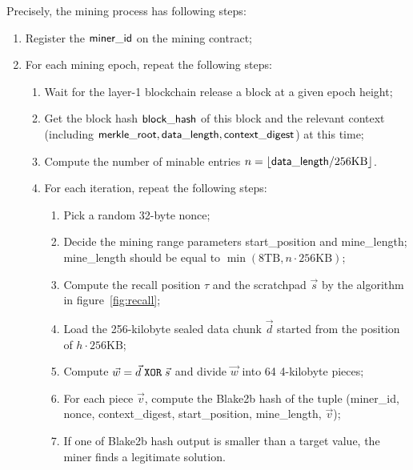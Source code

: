 Precisely, the mining process has following steps:
\begin{enumerate}
	\item Register the $\sf miner\_id$ on the mining contract;
	\item For each mining epoch, repeat the following steps:
	\begin{enumerate}
		\item Wait for the layer-1 blockchain release a block at a given epoch height;
		\item Get the block hash $\sf block\_hash$ of this block and the relevant context (including ${\sf merkle\_root, data\_length, context\_digest}$) at this time;
		\item Compute the number of minable entries $n=\lfloor {\sf data\_length} / 256\text{KB} \rfloor$.
		\item For each iteration, repeat the following steps:
		\begin{enumerate}
			\item Pick a random 32-byte {\sf nonce};
			\item Decide the mining range parameters {\sf start\_position} and {\sf mine\_length}; {\sf mine\_length} should be equal to $\min(8\text{TB},n\cdot 256\text{KB})$;
			\item Compute the recall position $\tau$ and the scratchpad $\vec{s}$ by the algorithm in figure~\ref{fig:recall};
			\item Load the 256-kilobyte sealed data chunk $\vec{d}$ started from the position of $h\cdot 256\text{KB}$;
			\item Compute $\vec{w}=\vec{d}{\;\tt XOR\; }\vec{s}$ and divide $\vec{w}$ into 64 4-kilobyte pieces;
			\item For each piece $\vec{v}$, compute the Blake2b hash of the tuple ({\sf miner\_id}, {\sf nonce}, {\sf context\_digest}, {\sf start\_position}, {\sf mine\_length}, $\vec{v}$); 
			\item If one of Blake2b hash output is smaller than a target value, the miner finds a legitimate {\sproof} solution.
		\end{enumerate}
	\end{enumerate}
\end{enumerate}

